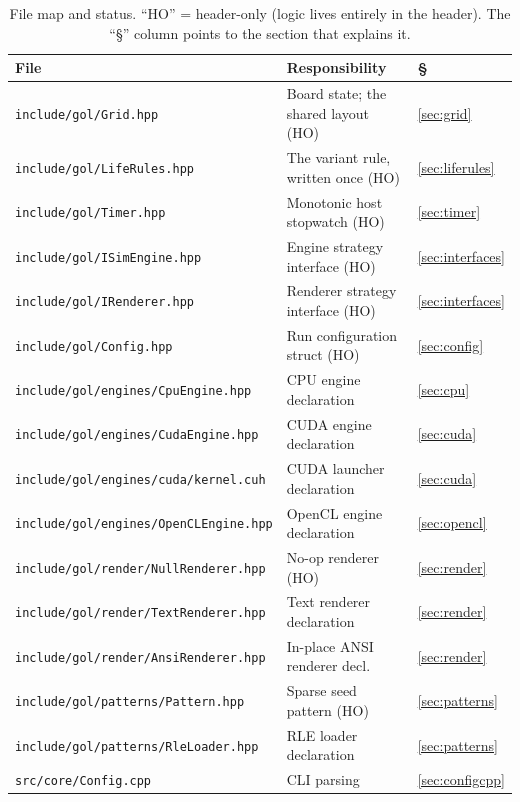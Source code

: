\documentclass[
	english,
	letterpaper, oneside
]{article}
\begin{document}
\begin{table}[H]
	\centering
	\caption{File map and status. ``HO'' = header-only (logic lives entirely in
	the header). The ``\S'' column points to the section that explains it.}
	\label{tab:files}
	\begin{tabular}{@{}lll@{}}
		\toprule
		\textbf{File} & \textbf{Responsibility} & \textbf{\S} \\
		\midrule
		\texttt{include/gol/Grid.hpp}            & Board state; the shared layout (HO) & \ref{sec:grid} \\
		\texttt{include/gol/LifeRules.hpp}        & The variant rule, written once (HO) & \ref{sec:liferules} \\
		\texttt{include/gol/Timer.hpp}           & Monotonic host stopwatch (HO) & \ref{sec:timer} \\
		\texttt{include/gol/ISimEngine.hpp}      & Engine strategy interface (HO) & \ref{sec:interfaces} \\
		\texttt{include/gol/IRenderer.hpp}       & Renderer strategy interface (HO) & \ref{sec:interfaces} \\
		\texttt{include/gol/Config.hpp}          & Run configuration struct (HO) & \ref{sec:config} \\
		\texttt{include/gol/engines/CpuEngine.hpp} & CPU engine declaration & \ref{sec:cpu} \\
		\texttt{include/gol/engines/CudaEngine.hpp} & CUDA engine declaration & \ref{sec:cuda} \\
		\texttt{include/gol/engines/cuda/kernel.cuh} & CUDA launcher declaration & \ref{sec:cuda} \\
		\texttt{include/gol/engines/OpenCLEngine.hpp} & OpenCL engine declaration & \ref{sec:opencl} \\
		\texttt{include/gol/render/NullRenderer.hpp} & No-op renderer (HO) & \ref{sec:render} \\
		\texttt{include/gol/render/TextRenderer.hpp} & Text renderer declaration & \ref{sec:render} \\
		\texttt{include/gol/render/AnsiRenderer.hpp} & In-place ANSI renderer decl. & \ref{sec:render} \\
		\texttt{include/gol/patterns/Pattern.hpp} & Sparse seed pattern (HO) & \ref{sec:patterns} \\
		\texttt{include/gol/patterns/RleLoader.hpp} & RLE loader declaration & \ref{sec:patterns} \\
		\texttt{src/core/Config.cpp}             & CLI parsing & \ref{sec:configcpp} \\

\end{tabular}
\end{table}
\end{document}
